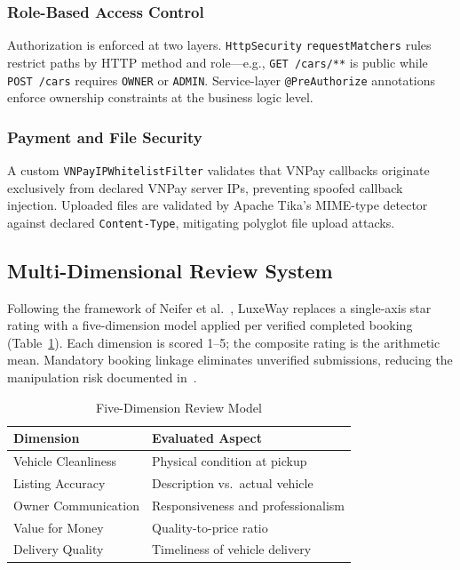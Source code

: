 \subsubsection{Role-Based Access Control}

Authorization is enforced at two layers. \texttt{HttpSecurity}
\texttt{requestMatchers} rules restrict paths by HTTP method and
role---e.g., \texttt{GET /cars/**} is public while \texttt{POST /cars}
requires \texttt{OWNER} or \texttt{ADMIN}. Service-layer
\texttt{@PreAuthorize} annotations enforce ownership constraints at
the business logic level.

\subsubsection{Payment and File Security}

A custom \texttt{VNPayIPWhitelistFilter} validates that VNPay callbacks
originate exclusively from declared VNPay server IPs, preventing spoofed
callback injection. Uploaded files are validated by Apache Tika's
MIME-type detector against declared \texttt{Content-Type}, mitigating
polyglot file upload attacks.

\subsection{Multi-Dimensional Review System}

Following the framework of Neifer et al.~\cite{neifer2024trust},
LuxeWay replaces a single-axis star rating with a five-dimension model
applied per verified completed booking (Table~\ref{tab:review_dims}).
Each dimension is scored 1--5; the composite rating is the arithmetic
mean. Mandatory booking linkage eliminates unverified submissions,
reducing the manipulation risk documented in~\cite{hu2019sharing}.

\begin{table}[htbp]
\centering
\caption{Five-Dimension Review Model}
\label{tab:review_dims}
\begin{tabular}{ll}
\toprule
\textbf{Dimension} & \textbf{Evaluated Aspect} \\
\midrule
Vehicle Cleanliness  & Physical condition at pickup \\
Listing Accuracy     & Description vs.\ actual vehicle \\
Owner Communication  & Responsiveness and professionalism \\
Value for Money      & Quality-to-price ratio \\
Delivery Quality     & Timeliness of vehicle delivery \\
\bottomrule
\end{tabular}
\end{table}
